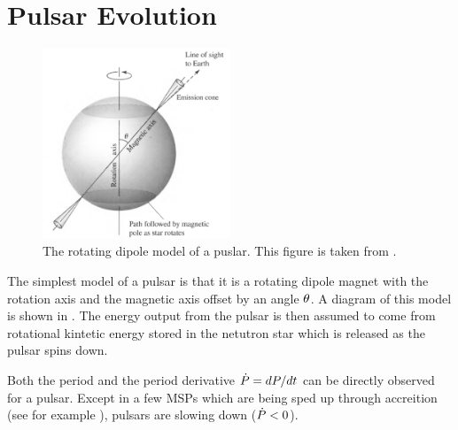 \section{Pulsar Evolution}








\begin{figure}[htbp]
  \centering
    \includegraphics[width=0.5\textwidth]{chapters/pulsar_pwn_system/figures/pulsar_model.pdf}
  \caption{The rotating dipole model
  of a puslar. This
  figure is taken from \citep{carroll_2006_introduction-modern}.
  }
\end{figure}

The simplest model of a pulsar is that it is a rotating dipole magnet
with the rotation axis and the magnetic axis offset by an angle
$\theta$.
A diagram of this model is shown in .
The energy output from the pulsar is
then assumed 
to come from rotational kintetic energy stored in
the netutron star which is released as the pulsar
spins down. 

Both the period \period and the period derivative
$\dot{P}=dP/dt$ can be directly observed for a pulsar.
Except in a few \acp{MSP} which are being sped up
through accreition (see for example \cite{falanga_2005_integral-observations}),
pulsars are slowing down ($\dot{P}<0$).

